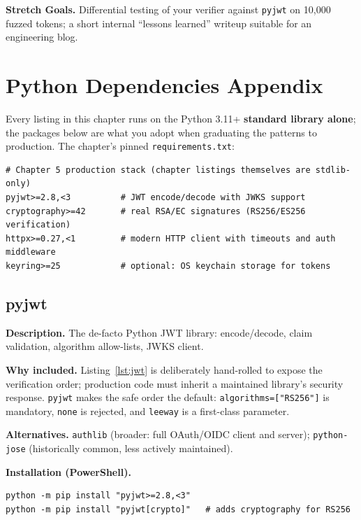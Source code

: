 \textbf{Stretch Goals.} Differential testing of your verifier against
\texttt{pyjwt} on 10{,}000 fuzzed tokens; a short internal
``lessons learned'' writeup suitable for an engineering blog.

\section{Python Dependencies Appendix}
\label{sec:ch5-dependencies}

Every listing in this chapter runs on the Python 3.11+ \textbf{standard
library alone}; the packages below are what you adopt when graduating the
patterns to production. The chapter's pinned \texttt{requirements.txt}:

\begin{verbatim}
# Chapter 5 production stack (chapter listings themselves are stdlib-only)
pyjwt>=2.8,<3          # JWT encode/decode with JWKS support
cryptography>=42       # real RSA/EC signatures (RS256/ES256 verification)
httpx>=0.27,<1         # modern HTTP client with timeouts and auth middleware
keyring>=25            # optional: OS keychain storage for tokens
\end{verbatim}

\subsection{pyjwt}

\textbf{Description.} The de-facto Python JWT library: encode/decode, claim
validation, algorithm allow-lists, JWKS client.

\textbf{Why included.} Listing~\ref{lst:jwt} is deliberately hand-rolled to
expose the verification order; production code must inherit a maintained
library's security response. \texttt{pyjwt} makes the safe order the
default: \texttt{algorithms=["RS256"]} is mandatory, \texttt{none} is
rejected, and \texttt{leeway} is a first-class parameter.

\textbf{Alternatives.} \texttt{authlib} (broader: full OAuth/OIDC client and
server); \texttt{python-jose} (historically common, less actively
maintained).

\textbf{Installation (PowerShell).}
\begin{verbatim}
python -m pip install "pyjwt>=2.8,<3"
python -m pip install "pyjwt[crypto]"   # adds cryptography for RS256
\end{verbatim}

